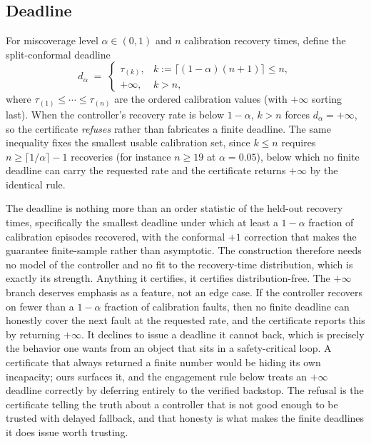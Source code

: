 \documentclass[journal]{IEEEtran}
\theoremstyle{plain}
\theoremstyle{definition}
\newcommand{\dalpha}{d_{\alpha}}
\begin{document}
\subsection{Deadline} For miscoverage level $\alpha\in(0,1)$ and $n$ calibration recovery
times, define the split-conformal deadline
\begin{equation}
  \label{eq:deadline}
  \dalpha \;=\;
  \begin{cases}
    \tau_{(k)}, & k := \lceil (1-\alpha)(n+1)\rceil \le n,\\
    +\infty, & k > n,
  \end{cases}
\end{equation}
where $\tau_{(1)}\le\cdots\le\tau_{(n)}$ are the ordered calibration values (with $+\infty$
sorting last). When the controller's recovery rate is below $1-\alpha$, $k>n$ forces
$\dalpha=+\infty$, so the certificate \emph{refuses} rather than fabricates a finite
deadline. The same inequality fixes the smallest usable calibration set, since $k\le n$
requires $n\ge\lceil1/\alpha\rceil-1$ recoveries (for instance $n\ge19$ at $\alpha=0.05$),
below which no finite deadline can carry the requested rate and the certificate returns
$+\infty$ by the identical rule.

The deadline is nothing more than an order statistic of the held-out recovery times,
specifically the smallest deadline under which at least a $1-\alpha$ fraction of calibration
episodes recovered, with the conformal $+1$ correction that makes the guarantee
finite-sample rather than asymptotic. The construction therefore needs no model of the
controller and no fit to the recovery-time distribution, which is exactly its strength.
Anything it certifies, it certifies distribution-free. The $+\infty$ branch deserves emphasis
as a feature, not an edge case. If the controller recovers on fewer than a $1-\alpha$
fraction of calibration faults, then no finite deadline can honestly cover the next fault at
the requested rate, and the certificate reports this by returning $+\infty$. It declines to
issue a deadline it cannot back, which is precisely the behavior one wants from an object that
sits in a safety-critical loop. A certificate that always returned a finite number would be
hiding its own incapacity; ours surfaces it, and the engagement rule below treats an
$+\infty$ deadline correctly by deferring entirely to the verified backstop. The refusal is
the certificate telling the truth about a controller that is not good enough to be trusted
with delayed fallback, and that honesty is what makes the finite deadlines it does issue
worth trusting.
\end{document}
